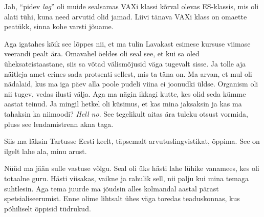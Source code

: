 
Jah, \enquote{pidev \emph{lag}} oli muide sealsamas VAXi klassi kõrval olevas 
ES-klassis, mis oli alati tühi, kuna need arvutid olid jamad. Liivi tänava 
VAXi klass on omaette peatükk, sinna kohe varsti jõuame.

Aga igatahes kõik see lõppes nii, et ma tulin Lavakast esimese kursuse viimase veerandi 
pealt ära. Omavahel öeldes oli seal see, et kui sa oled üheksateistaastane, 
siis sa  võtad välismõjusid väga tugevalt sisse. Ja tolle aja  
näitleja amet erines sada protsenti sellest, mis ta täna on. Ma arvan, et  mul 
oli nädalaid, kus ma iga päev alla poole pudeli viina ei joonudki üldse. 
Organism oli nii tugev, vedas ilusti välja. Aga ma nägin ikkagi kutte, kes olid 
seda kümme aastat teinud. Ja mingil hetkel oli küsimus, et kas mina jaksaksin 
ja kas ma tahaksin ka niimoodi? \emph{Hell no}. See tegelikult  aitas ära 
tuleku otsust vormida, pluss see lendamistrenn akna taga. 

Siis ma läksin Tartusse Eesti keelt, täpsemalt 
arvutuslingvistikat, õppima. See on ilgelt lahe ala, minu arust.


Nüüd ma jään sulle vastuse võlgu. Seal oli üks hästi lahe lühike vanamees, kes 
oli  totaalne guru. Hästi viisakas, vaikne ja rahulik sell, nii palju kui 
mina temaga suhtlesin. Aga tema juurde ma jõudsin alles kolmandal aastal pärast 
spetsialiseerumist. Enne olime lihtsalt ühes väga toredas teaduskonnas, kus 
põhiliselt õppisid tüdrukud.

